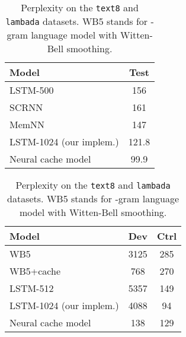\documentclass{article} \usepackage{iclr2017_conference,times}
\begin{document}
\begin{table}
  \small
  \centering
  \begin{subtable}{0.44 \textwidth}
  \begin{tabular}{lc}
    \toprule
    Model & Test \\
    \midrule
    LSTM-500~\citep{mikolov2014learning}   & 156 \\
    SCRNN~\citep{mikolov2014learning}      & 161 \\
    MemNN~\citep{sukhbaatar2015end}        & 147 \\
    \midrule
    LSTM-1024 (our implem.)                & 121.8 \\
    Neural cache model                     &  99.9 \\
    \bottomrule
  \end{tabular}
  \caption{\texttt{text8}}
  \end{subtable}
  \hfill
  \begin{subtable}{0.50 \textwidth}
  \begin{tabular}{lcc}
    \toprule
    Model & Dev & Ctrl \\
    \midrule
    WB5~\citep{paperno2016lambada}       & 3125 & 285 \\
    WB5+cache~\citep{paperno2016lambada} &  768 & 270 \\
    LSTM-512~\citep{paperno2016lambada}           & 5357 & 149 \\
    \midrule
    LSTM-1024 (our implem.)                   & 4088 &  94 \\
    Neural cache model                        &  138 & 129 \\
    \bottomrule
  \end{tabular}
  \caption{\texttt{lambada}}
  \end{subtable}

  \caption{Perplexity on the \texttt{text8} and \texttt{lambada} datasets. WB5 stands for -gram language model with Witten-Bell smoothing.}
  \label{tab:text8}
\end{table}
\end{document}
